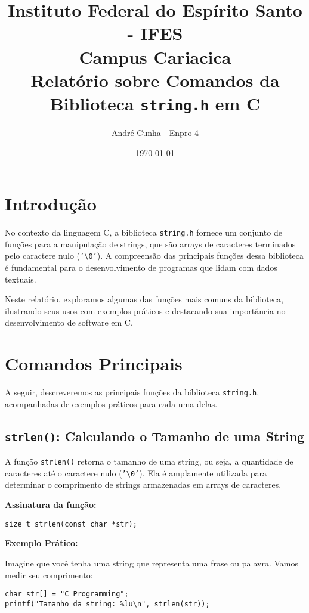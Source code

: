\documentclass[12pt]{article}
\title{
    {\normalsize Instituto Federal do Espírito Santo - IFES} \\
    {\normalsize Campus Cariacica} \\
    \vspace{2cm}
    \textbf{Relatório sobre Comandos da Biblioteca \texttt{string.h} em C}
    \vspace{2cm}
}
\author{André Cunha - Enpro 4}
\date{\today}
\begin{document}
\maketitle
\newpage

\tableofcontents
\newpage

\section{Introdução}
No contexto da linguagem C, a biblioteca \texttt{string.h} fornece um conjunto de funções para a manipulação de strings, que são arrays de caracteres terminados pelo caractere nulo (\texttt{'\textbackslash 0'}). A compreensão das principais funções dessa biblioteca é fundamental para o desenvolvimento de programas que lidam com dados textuais.

Neste relatório, exploramos algumas das funções mais comuns da biblioteca, ilustrando seus usos com exemplos práticos e destacando sua importância no desenvolvimento de software em C.

\section{Comandos Principais}

A seguir, descreveremos as principais funções da biblioteca \texttt{string.h}, acompanhadas de exemplos práticos para cada uma delas.

\subsection{\texttt{strlen()}: Calculando o Tamanho de uma String}
A função \texttt{strlen()} retorna o tamanho de uma string, ou seja, a quantidade de caracteres até o caractere nulo (\texttt{'\textbackslash 0'}). Ela é amplamente utilizada para determinar o comprimento de strings armazenadas em arrays de caracteres.

\textbf{Assinatura da função:}

\begin{lstlisting}
size_t strlen(const char *str);
\end{lstlisting}

\textbf{Exemplo Prático:}

Imagine que você tenha uma string que representa uma frase ou palavra. Vamos medir seu comprimento:

\begin{lstlisting}
char str[] = "C Programming";
printf("Tamanho da string: %lu\n", strlen(str));
\end{lstlisting}
\end{document}
